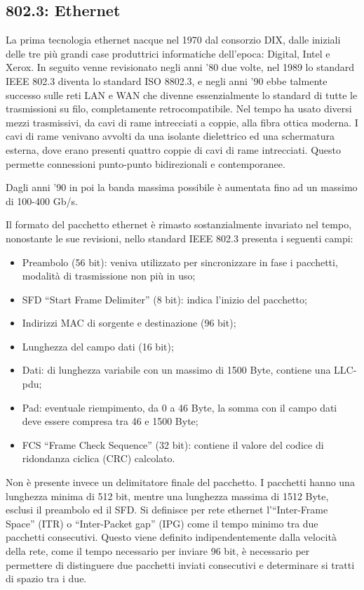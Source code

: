 \documentclass{article}
\numberwithin{equation}{subsection}
\begin{document}

\subsection{802.3: Ethernet}

La prima tecnologia ethernet nacque nel 1970 dal consorzio DIX, dalle iniziali delle tre più grandi case produttrici informatiche dell'epoca: Digital, Intel e Xerox. 
In seguito venne revisionato negli anni '80 due volte, nel 1989 lo standard IEEE 802.3 diventa lo standard ISO 8802.3, e negli anni '90 ebbe talmente successo sulle reti LAN e WAN che divenne essenzialmente lo 
standard di tutte le trasmissioni su filo, completamente retrocompatibile. 
Nel tempo ha usato diversi mezzi trasmissivi, da cavi di rame intrecciati a coppie, alla fibra ottica moderna. I cavi di rame venivano avvolti da una isolante dielettrico ed una schermatura esterna, dove erano 
presenti quattro coppie di cavi di rame intrecciati. Questo permette connessioni punto-punto bidirezionali e contemporanee. 

Dagli anni '90 in poi la banda massima possibile è aumentata fino ad un massimo di 100-400 Gb/s. 



Il formato del pacchetto ethernet è rimasto sostanzialmente invariato nel tempo, nonostante le sue revisioni, nello standard IEEE 802.3 presenta i seguenti campi:
\begin{itemize}
  \item Preambolo (56 bit): veniva utilizzato per sincronizzare in fase i pacchetti, modalità di trasmissione non più in uso;
  \item SFD ``Start Frame Delimiter'' (8 bit): indica l'inizio del pacchetto;
  \item Indirizzi MAC di sorgente e destinazione (96 bit);
  \item Lunghezza del campo dati (16 bit);
  \item Dati: di lunghezza variabile con un massimo di 1500 Byte, contiene una LLC-pdu;
  \item Pad: eventuale riempimento, da 0 a 46 Byte, la somma con il campo dati deve essere compresa tra 46 e 1500 Byte;
  \item FCS ``Frame Check Sequence'' (32 bit): contiene il valore del codice di ridondanza ciclica (CRC) calcolato. 
\end{itemize}

Non è presente invece un delimitatore finale del pacchetto. I pacchetti hanno una lunghezza minima di 512 bit, mentre una lunghezza massima di 1512 Byte, esclusi il preambolo ed il SFD. Si definisce per rete ethernet 
l'``Inter-Frame Space'' (ITR) o ``Inter-Packet gap'' (IPG) come il tempo minimo tra due pacchetti consecutivi. Questo viene definito indipendentemente dalla velocità della rete, come il tempo necessario per 
inviare 96 bit, è necessario per permettere di distinguere due pacchetti inviati consecutivi e determinare si tratti di spazio tra i due. 
\end{document}
